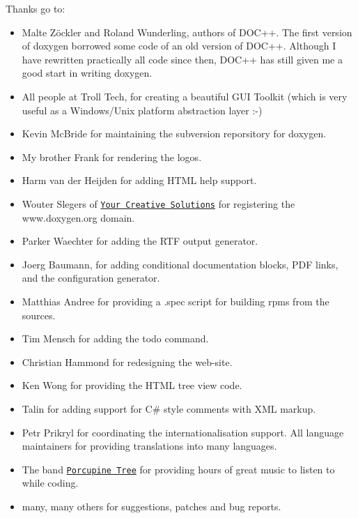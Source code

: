 Thanks go to: \begin{itemize}
\item {} Malte Z\"{o}ckler and Roland Wunderling, authors of DOC++. The first version of doxygen borrowed some code of an old version of DOC++. Although I have rewritten practically all code since then, DOC++ has still given me a good start in writing doxygen. \item All people at Troll Tech, for creating a beautiful GUI Toolkit (which is very useful as a Windows/Unix platform abstraction layer :-) \item Kevin McBride for maintaining the subversion reporsitory for doxygen. \item My brother Frank for rendering the logos. \item Harm van der Heijden for adding HTML help support. \item Wouter Slegers of \href{http://www.yourcreativesolutions.nl}{\tt Your Creative Solutions} for registering the www.doxygen.org domain. \item Parker Waechter for adding the RTF output generator. \item Joerg Baumann, for adding conditional documentation blocks, PDF links, and the configuration generator. \item Matthias Andree for providing a .spec script for building rpms from the sources. \item Tim Mensch for adding the todo command. \item Christian Hammond for redesigning the web-site. \item Ken Wong for providing the HTML tree view code. \item Talin for adding support for C\# style comments with XML markup. \item Petr Prikryl for coordinating the internationalisation support. All language maintainers for providing translations into many languages. \item The band \href{http://www.porcupinetree.com}{\tt Porcupine Tree} for providing hours of great music to listen to while coding. \item many, many others for suggestions, patches and bug reports. \end{itemize}
